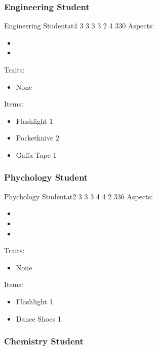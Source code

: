 \documentclass[11pt]{article}
\begin{document}
{\subsubsection{Engineering Student}
\label{sec:org610a2a4}

\begin{npc}{Engineering Student}{at}{4 3 3 3 3 2 4 3}{30}
Aspects:
\begin{itemize}
\item {}
\item {}
\end{itemize}
\columnbreak

Traits:
\begin{itemize}
\item None
\end{itemize}

Items:
\begin{itemize}
\item Flashlight 1
\item Pocketknive 2
\item Gaffa Tape 1
\end{itemize}
\end{npc}
\subsubsection{Phychology Student}
\label{sec:org3e62796}

\begin{npc}{Phychology Student}{at}{2 3 3 3 4 4 2 3}{36}
Aspects:
\begin{itemize}
\item {}
\item {}
\item {}
\end{itemize}
\columnbreak

Traits:
\begin{itemize}
\item None
\end{itemize}

Items:
\begin{itemize}
\item Flashlight 1
\item Dance Shoes 1
\end{itemize}
\end{npc}
\subsubsection{Chemistry Student}
\label{sec:org5096f50}

}
\end{document}
